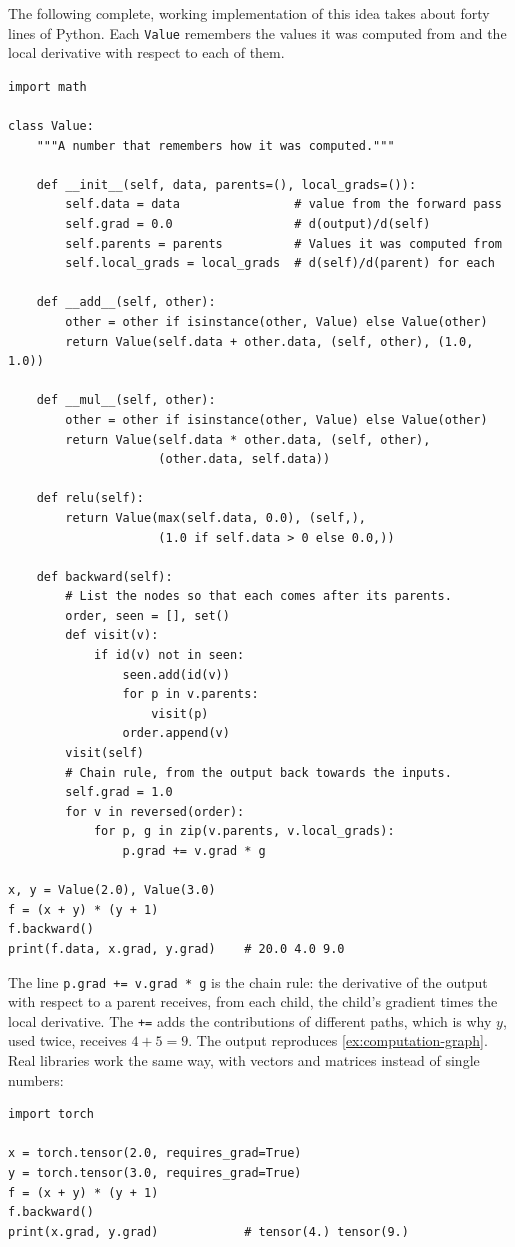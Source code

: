 The following complete, working implementation of this idea takes about
forty lines of Python. Each \texttt{Value} remembers the values it was computed
from and the local derivative with respect to each of them.
\begin{lstlisting}
import math

class Value:
    """A number that remembers how it was computed."""

    def __init__(self, data, parents=(), local_grads=()):
        self.data = data                # value from the forward pass
        self.grad = 0.0                 # d(output)/d(self)
        self.parents = parents          # Values it was computed from
        self.local_grads = local_grads  # d(self)/d(parent) for each

    def __add__(self, other):
        other = other if isinstance(other, Value) else Value(other)
        return Value(self.data + other.data, (self, other), (1.0, 1.0))

    def __mul__(self, other):
        other = other if isinstance(other, Value) else Value(other)
        return Value(self.data * other.data, (self, other),
                     (other.data, self.data))

    def relu(self):
        return Value(max(self.data, 0.0), (self,),
                     (1.0 if self.data > 0 else 0.0,))

    def backward(self):
        # List the nodes so that each comes after its parents.
        order, seen = [], set()
        def visit(v):
            if id(v) not in seen:
                seen.add(id(v))
                for p in v.parents:
                    visit(p)
                order.append(v)
        visit(self)
        # Chain rule, from the output back towards the inputs.
        self.grad = 1.0
        for v in reversed(order):
            for p, g in zip(v.parents, v.local_grads):
                p.grad += v.grad * g

x, y = Value(2.0), Value(3.0)
f = (x + y) * (y + 1)
f.backward()
print(f.data, x.grad, y.grad)    # 20.0 4.0 9.0
\end{lstlisting}
The line \texttt{p.grad += v.grad * g} is the chain rule: the derivative of the
output with respect to a parent receives, from each child, the child's gradient
times the local derivative. The \texttt{+=} adds the contributions of different
paths, which is why $y$, used twice, receives $4 + 5 = 9$. The output reproduces
\cref{ex:computation-graph}. Real libraries work the same way, with vectors and
matrices instead of single numbers:
\par\noindent\begin{minipage}{\linewidth}
\begin{lstlisting}
import torch

x = torch.tensor(2.0, requires_grad=True)
y = torch.tensor(3.0, requires_grad=True)
f = (x + y) * (y + 1)
f.backward()
print(x.grad, y.grad)            # tensor(4.) tensor(9.)
\end{lstlisting}
\end{minipage}\par

